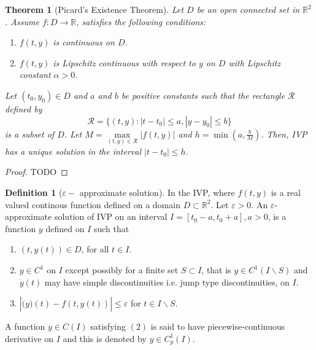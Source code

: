 \documentclass[12pt,reqno]{amsart}
\theoremstyle{plain}
\newtheorem{thm}{Theorem}
\theoremstyle{definition}
\newtheorem{defn}{Definition}
\newcommand{\bb}[1]{\mathbb{#1}}
\newcommand{\cal}[1]{\mathcal{#1}}
\begin{document}
\begin{thm}[Picard's Existence Theorem]
    Let $D$ be an open connected set in $\bb R^2$. Assume $f:D \to \bb R$, satisfies the following conditions:
    \begin{enumerate}
        \item $f(t,y)$ is continuous on $D$.
        \item $f(t,y)$ is Lipschitz continuous with respect to $y$ on $D$ with Lipschitz constant $\alpha > 0$.
    \end{enumerate}
    Let $(t_0, y_0) \in D$ and $a$ and $b$ be positive constants such that the rectangle $\cal R$ defined by
    $$ \cal R = \{(t,y) : |t-t_0| \leq a, |y-y_0| \leq b\}$$
    is a subset of $D$. Let $M = \max\limits_{(t,y) \in \cal R} |f(t,y)|$ and $h = \min\left(a,\frac{b}{M}\right)$. Then, IVP has a unique solution in the interval $|t-t_0| \leq h$.
\end{thm}

\begin{proof}
    TODO
\end{proof}
\begin{defn}[$\varepsilon-$ approximate solution]
    In the IVP, where $f(t,y)$ is a real valued continous function defined on a domain $D \subset \bb R^2$. Let $\varepsilon > 0$. An $\varepsilon$-approximate solution of IVP on an interval $I = [t_0 - a, t_0 + a], a > 0$, is a function $y$ defined on $I$ such that
    \begin{enumerate}
        \item $(t,y(t)) \in D$, for all $t \in I$.
        \item $y \in C^1$ on $I$ except possibly for a finite set $S \subset I$, that is $y \in C^1(I\backslash S)$ and $\dot{y}(t)$ may have simple discontinuities i.e. jump type discontinuities, on $I$.
        \item $|\dot(y)(t) - f(t,y(t))| \leq \varepsilon$ for $t \in I \backslash S$.
    \end{enumerate} 
    A function $y \in C(I)$ satisfying $(2)$ is said to have piecewise-continuous derivative on $I$ and this is denoted by $y \in C^1_p(I)$.
\end{defn}

\end{document}
